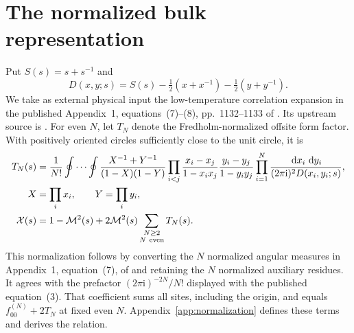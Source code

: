 \documentclass[11pt]{article}
\numberwithin{equation}{section}
\theoremstyle{definition}
\newcommand{\dd}{\,\mathrm d}
\newcommand{\ii}{\mathrm i}
\newcommand{\M}{\mathcal M}
\begin{document}
\section{The normalized bulk representation}\label{sec:setup}
Put \(S(s)=s+s^{-1}\) and
\[
 D(x,y;s)=S(s)-\tfrac12(x+x^{-1})-\tfrac12(y+y^{-1}).
\]
We take as external physical input the low-temperature correlation
expansion in the published Appendix~1, equations~(7)--(8),
pp.~1132--1133 of \cite{TW2014}. Its upstream source is
\cite[Cor.~2.0, p.~351; Thm.~4.1, p.~361; Thm.~5.0, p.~374,
and proof pp.~375--378]{PalmerTracy1981}.
For even \(N\), let \(T_N\) denote the Fredholm-normalized offsite
form factor. With positively oriented circles sufficiently close to the
unit circle, it is
\begin{align}
 T_N(s)&=\frac1{N!}\oint\cdots\oint
 \frac{X^{-1}+Y^{-1}}{(1-X)(1-Y)}
 \prod_{i<j}\frac{x_i-x_j}{1-x_ix_j}
              \frac{y_i-y_j}{1-y_iy_j}
 \prod_{i=1}^N\frac{\dd x_i\,\dd y_i}{(2\pi\ii)^2D(x_i,y_i;s)},\label{eq:double}\\
 X&=\prod_i x_i,\qquad Y=\prod_i y_i, \nonumber\\
 \mathcal X(s)&=1-\M^2(s)+2\M^2(s)\sum_{\substack{N\ge2\\N\ {\rm even}}}T_N(s).
 \label{eq:bulk}
\end{align}
This normalization follows by converting the \(N\) normalized angular
measures in Appendix~1, equation~(7), of \cite{TW2014} and retaining
the \(N\) normalized auxiliary residues. It agrees with the prefactor
\((2\pi\ii)^{-2N}/N!\) displayed with the published equation~(3).
That coefficient sums all sites, including the origin, and equals
\(f_{00}^{(N)}+2T_N\) at fixed even \(N\).
Appendix~\ref{app:normalization} defines these terms and derives the relation.
\end{document}
